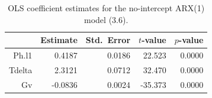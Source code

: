 \begin{table}[ht]
\centering
\caption{OLS coefficient estimates for the no-intercept ARX(1) model (3.6).} 
\label{tab:arx1_coef}
\begin{tabular}{rrrrr}
  \toprule
 & Estimate & Std.\ Error & $t$-value & $p$-value \\ 
  \midrule
Ph.l1 & 0.4187 & 0.0186 & 22.523 & 0.0000 \\ 
  Tdelta & 2.3121 & 0.0712 & 32.470 & 0.0000 \\ 
  Gv & -0.0836 & 0.0024 & -35.373 & 0.0000 \\ 
   \bottomrule
\end{tabular}
\end{table}

